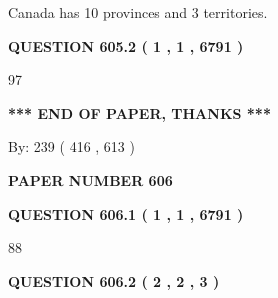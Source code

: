\documentclass[12pt]{article}
\begin{document}
 
Canada has 10  provinces and 3 territories.
 
 
 
 
  
\vspace{0.2in}
  
{\textbf{\Large{QUESTION
605.2 
 ( 1 , 1 , 6791 )
}}}
  
  
 
 
\noindent{}

97
 
 
   
   
 \vspace{0.2in}
 
   
   
   
   
\vspace{1.0in} 
{\textbf{\large{ *** END OF PAPER, THANKS *** }}} 
   
   
\hspace{1.0in} By: 
 239 ( 416 ,  613 )
   
   
   
   
\newpage 
\setcounter{page}{ 
   606001 } 
   
   
   
   
 {\textbf{ \Large{ PAPER NUMBER  606  }}}
   
   
\vspace{0.2in}
   
   
   
   
   
   
 \vspace{0.2in}
 
 
 
 
   
   
  
\vspace{0.2in}
  
{\textbf{\Large{QUESTION
606.1 
 ( 1 , 1 , 6791 )
}}}
  
  
 
 
\noindent{}

88
 
 
  
\vspace{0.2in}
  
{\textbf{\Large{QUESTION
606.2 
 ( 2 , 2 , 3 )
}}}
  
\end{document}
